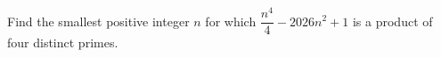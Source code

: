 Find the smallest positive integer $n$ for which $\dfrac{n^4}{4}-2026n^2+1$ is a product of four distinct primes.
